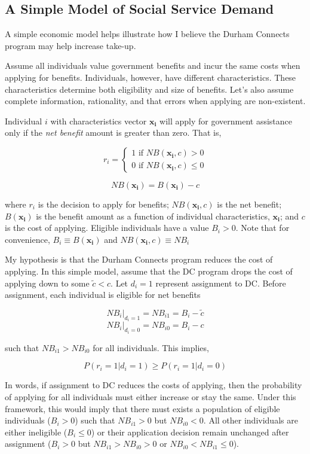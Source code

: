 \documentclass[12pt,letterpaperpaper,]{book}
\begin{document}
\subsection*{A Simple Model of Social Service
Demand}\label{a-simple-model-of-social-service-demand}

A simple economic model helps illustrate how I believe the Durham
Connects program may help increase take-up.

Assume all individuals value government benefits and incur the same
costs when applying for benefits. Individuals, however, have different
characteristics. These characteristics determine both eligibility and
size of benefits. Let's also assume complete information, rationality,
and that errors when applying are non-existent.

Individual \(i\) with characteristics vector \(\bm{x_i}\) will apply for
government assistance only if the \emph{net benefit} amount is greater
than zero. That is,

\[
r_i  = \left \{
  \begin{array}{c}
    1 \text{ if } NB(\bm{x_i}, c) > 0 \\
    0 \text{ if } NB(\bm{x_i}, c) \le 0
  \end{array} \right.
\]

\[
  NB(\bm{x_i}) = B(\bm{x_i}) - c
\]

where \(r_i\) is the decision to apply for benefits; \(NB(\bm{x_i}, c)\)
is the net benefit; \(B(\bm{x_i})\) is the benefit amount as a function
of individual characteristics, \(\bm{x_i}\); and \(c\) is the cost of
applying. Eligible individuals have a value \(B_i > 0\). Note that for
convenience, \(B_i \equiv B(\bm{x_i})\) and
\(NB(\bm{x_i}, c) \equiv NB_i\)

My hypothesis is that the Durham Connects program reduces the cost of
applying. In this simple model, assume that the DC program drops the
cost of applying down to some \(\tilde c < c\). Let \(d_i = 1\)
represent assignment to DC. Before assignment, each individual is
eligible for net benefits

\[NB_i|_{d_i=1} = NB_{i1} = B_i - \tilde c\]
\[NB_i|_{d_i=0} = NB_{i0} = B_i - c\]

such that \(NB_{i1} > NB_{i0}\) for all individuals. This implies,

\[P(r_i = 1|d_i = 1) \ge P(r_i=1|d_i = 0)\]

In words, if assignment to DC reduces the costs of applying, then the
probability of applying for all individuals must either increase or stay
the same. Under this framework, this would imply that there must exists
a population of eligible individuals (\(B_i > 0\)) such that
\(NB_{i1} > 0\) but \(NB_{i0} < 0\). All other individuals are either
ineligible (\(B_i \le 0\)) or their application decision remain
unchanged after assignment (\(B_i > 0\) but \(NB_{i1} > NB_{i0} > 0\) or
\(NB_{i0} < NB_{i1} \le 0\)).
\end{document}
